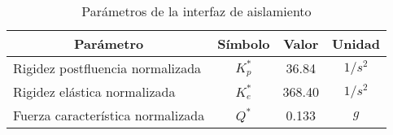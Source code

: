 \begin{table}[!ht]
\centering
\vspace{1.5 mm}
\caption[Parámetros de la interfaz de aislamiento]{\centering\footnotesize Parámetros de la interfaz de aislamiento}
\vspace{1 mm}
\begin{tabular}{|l|c|c|c|}
\hline
\multicolumn{1}{|c|}{Parámetro}     & Símbolo     & Valor  & Unidad            \\ \hline
Rigidez   postfluencia normalizada  & $K_{p}^{*}$ & 36.84  & $1/s^{2}$ \\ \hline
Rigidez   elástica normalizada      & $K_{e}^{*}$ & 368.40 & $1/s^{2}$ \\ \hline
Fuerza   característica normalizada & $Q^{*}$     & 0.133   & $g$               \\ \hline
\end{tabular}
\label{Ca3_Tabla1}
\end{table}
